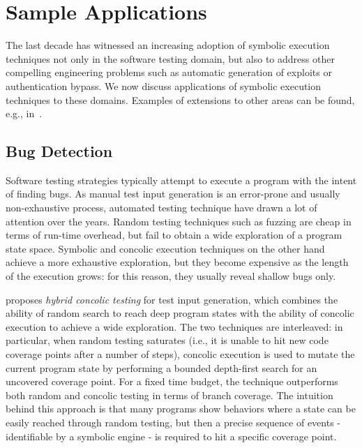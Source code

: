 
\section{Sample Applications}
\label{se:applications}

The last decade has witnessed an increasing adoption of symbolic execution techniques not only in the software testing domain, but also to address other compelling engineering problems such as automatic generation of exploits or authentication bypass. We now discuss  applications of symbolic execution techniques to these domains. Examples of extensions to other areas can be found, e.g., in~\cite{CGK-ICSE11}.

\subsection{Bug Detection}
\label{ss:bug-detection}

Software testing strategies typically attempt to execute a program with the intent of finding bugs. As manual test input generation is an error-prone and usually non-exhaustive process, automated testing technique have drawn a lot of attention over the years. Random testing techniques such as fuzzing are cheap in terms of run-time overhead, but fail to obtain a wide exploration of a program state space. Symbolic and concolic execution techniques on the other hand achieve a more exhaustive exploration, but they become expensive as the length of the execution grows: for this reason, they usually reveal shallow bugs only.

\cite{RK-ICSE07} proposes {\em hybrid concolic testing} for test input generation, which combines the ability of random search to reach deep program states with the ability of concolic execution to achieve a wide exploration. The two techniques are interleaved: in particular, when random testing saturates (i.e., it is unable to hit new code coverage points after a number of steps), concolic execution is used to mutate the current program state by performing a bounded depth-first search for an uncovered coverage point. For a fixed time budget, the technique outperforms both random and concolic testing in terms of branch coverage. The intuition behind this approach is that many programs show behaviors where a state can be easily reached through random testing, but then a precise sequence of events - identifiable by a symbolic engine - is required to hit a specific coverage point.

